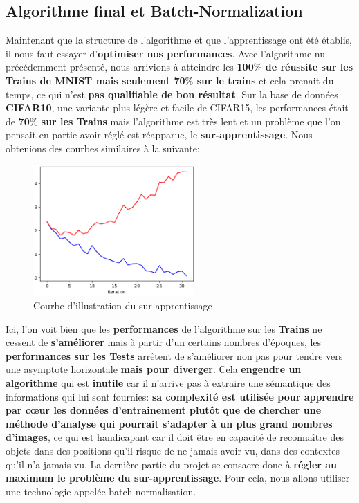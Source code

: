 \documentclass[12pt,a4paper]{extarticle}
\begin{document}
\subsection{Algorithme final et Batch-Normalization}
Maintenant que la structure de l'algorithme et que l'apprentissage ont été établis, il nous faut essayer d'\textbf{optimiser nos performances}. Avec l'algorithme nu précédemment présenté, nous arrivions à atteindre les \textbf{100$\%$ de réussite sur les Trains de MNIST mais seulement 70$\%$ sur le trains} et cela prenait du temps, ce qui n'est \textbf{pas qualifiable de bon résultat}. Sur la base de données \textbf{CIFAR10}, une variante plus légère et facile de CIFAR15, les performances était de \textbf{70$\%$ sur les Trains} mais l'algorithme est très lent et un problème que l'on pensait en partie avoir réglé est réapparue, le \textbf{sur-apprentissage}. Nous obtenions des courbes similaires à la suivante: \\
\begin{figure}[h]
\centering
\includegraphics[height=5cm]{overfittingl}
\caption{Courbe d'illustration du sur-apprentissage}
\end{figure}
\newpage
Ici, l'on voit bien que les \textbf{performances} de l'algorithme sur les \textbf{Trains }ne cessent de \textbf{s'améliorer} mais à partir d'un certains nombres d'époques, les \textbf{performances sur les Tests} arrêtent de s'améliorer non pas pour tendre vers une asymptote horizontale \textbf{mais pour diverger}. Cela \textbf{engendre un algorithme} qui est \textbf{inutile} car il n'arrive pas à extraire une sémantique des informations qui lui sont fournies: \textbf{sa complexité est utilisée pour apprendre par cœur les données d'entrainement plutôt que de chercher une méthode d'analyse qui pourrait s'adapter à un plus grand nombres d'images}, ce qui est handicapant car il doit être en capacité de reconnaître des objets dans des positions qu'il risque de ne jamais avoir vu, dans des contextes qu'il n'a jamais vu. La dernière partie du projet se consacre donc à \textbf{régler au maximum le problème du sur-apprentissage}. Pour cela, nous allons utiliser une technologie appelée batch-normalisation.
\end{document}
